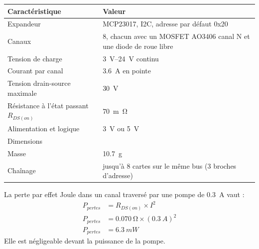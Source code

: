 \noindent
\begin{table}[H]
\centering
\begin{tabularx}{\linewidth}{lY}
\hline
Caractéristique & Valeur \\
\hline
Expandeur & MCP23017, I2C, adresse par défaut 0x20 \\
Canaux & 8, chacun avec un MOSFET AO3406 canal N et une diode de roue libre \\
Tension de charge & \qtyrange{3}{24}{V} continu \\
Courant par canal & \qty{3,6}{A} en pointe \\
Tension drain-source maximale & \qty{30}{V} \\
Résistance à l'état passant $R_{DS(on)}$ & \qty{70}{m\ohm} \\
Alimentation et logique & \qty{3}{V} ou \qty{5}{V} \\
Dimensions &  \\
Masse & \qty{10,7}{g} \\
Chaînage & jusqu'à 8 cartes sur le même bus (3 broches d'adresse) \\
\hline
\end{tabularx}
\end{table}
La perte par effet Joule dans un canal traversé par une pompe de \qty{0,3}{A} vaut :
\begin{align*}
P_{pertes} &= R_{DS(on)} \times I^2\\
P_{pertes} &= \qty{0,070}{\ohm} \times (\qty{0,3}{A})^2\\
P_{pertes} &= \qty{6,3}{mW}
\end{align*}
Elle est négligeable devant la puissance de la pompe.

